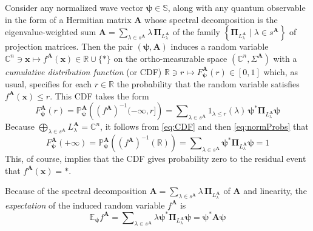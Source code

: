 \documentclass[11pt]{article}
\newcommand \R { \mathbb{R} }
\newcommand \C { \mathbb{C} }
\newcommand \Sph { \mathbb{S} }
\begin{document}
Consider any normalized wave vector $ \boldsymbol \psi \in \Sph $, 
along with any quantum observable in the form of a Hermitian matrix $ \mathbf A$
whose spectral decomposition is the eigenvalue-weighted sum 
 \( \mathbf A = \sum _{ \lambda \in s^{ \mathbf A} }
 	 \lambda \, \boldsymbol \Pi _{ L^{ \mathbf A} _\lambda } \) of the family 
 \( \left\{ \boldsymbol \Pi _{ L^{ \mathbf A} _\lambda } 
\mid \lambda \in s^{ \mathbf A} \right\} \) of projection matrices.
Then the pair $( \boldsymbol \psi, \mathbf A) $ induces a random variable 
 \( \C^n \owns \mathbf x \mapsto f^{ \mathbf A} ( \mathbf x) \in \R \cup \{ * \} \)
on the ortho-measurable space $( \C^n, \Sigma ^{ \mathbf A}) $
with a \emph{cumulative distribution function} (or CDF)
\( \R \owns r \mapsto F^{ \mathbf A} _{ \boldsymbol \psi } (r) \in [0, 1] \) which, as usual,
specifies for each $r \in \R$ the probability that the random variable 
satisfies $ f^{ \mathbf A} ( \mathbf x) \le r$.
This CDF takes the form
\begin{equation} \label{eq:CDF}
	F^{ \mathbf A} _{ \boldsymbol \psi } (r) = \mathbb P^{ \mathbf A} _{ \boldsymbol \psi } 
	\left( ( f^{ \mathbf A} )^{-1} ( - \infty, r] \right)
	= \sum\nolimits _{ \lambda \in s^{ \mathbf A} } 1_{ \lambda \le r} ( \lambda ) \,
	\boldsymbol \psi ^* \boldsymbol \Pi _{ L^{ \mathbf A} _\lambda } \boldsymbol \psi
\end{equation}
Because $ \bigoplus _{ \lambda \in s^{ \mathbf A} } L^{ \mathbf A} _\lambda = \C^n $,
it follows from \eqref{eq:CDF} and then \eqref{eq:normProbs} that
\begin{equation} \label{eq:CDFtop}
	F^{ \mathbf A} _{ \boldsymbol \psi } ( + \infty ) 
	= \mathbb P^{ \mathbf A} _{ \boldsymbol \psi } 
	\left( ( f^{ \mathbf A} )^{-1} ( \R ) \right)
	= \sum\nolimits _{ \lambda \in s^{ \mathbf A} }
	\boldsymbol \psi ^* \boldsymbol \Pi _{ L^{ \mathbf A} _\lambda } \boldsymbol \psi
	= 1
\end{equation}
This, of course, implies that the CDF gives probability zero 
to the residual event that $ f^{ \mathbf A} ( \mathbf x) = *$.

Because of the spectral decomposition 
 \( \mathbf A = \sum _{ \lambda \in s^{ \mathbf A} }
 	 \lambda \, \boldsymbol \Pi _{ L^{ \mathbf A} _\lambda } \) of $ \mathbf A$ 
and linearity, the \emph{expectation} of the induced random variable $ f^{ \mathbf A} $ is
\[ \mathbb E_{ \boldsymbol \psi } f^{ \mathbf A} 
 	= \sum\nolimits _{ \lambda \in s^{ \mathbf A} } \lambda
	\boldsymbol \psi ^* \boldsymbol \Pi _{ L^{ \mathbf A} _\lambda } \boldsymbol \psi
	= \boldsymbol \psi ^* \mathbf A \boldsymbol \psi \]
\end{document}
